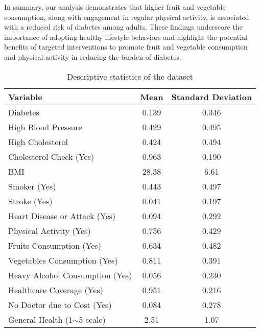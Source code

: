 \documentclass[11pt]{article}
\begin{document}
In summary, our analysis demonstrates that higher fruit and vegetable consumption, along with engagement in regular physical activity, is associated with a reduced risk of diabetes among adults. These findings underscore the importance of adopting healthy lifestyle behaviors and highlight the potential benefits of targeted interventions to promote fruit and vegetable consumption and physical activity in reducing the burden of diabetes.\begin{table}[!htbp]
\centering
\caption{Descriptive statistics of the dataset}
\label{table1}
\begin{tabular}{l c c}
\toprule
\textbf{Variable}                & \textbf{Mean}       & \textbf{Standard Deviation} \\
\midrule
Diabetes                         & 0.139               & 0.346                       \\
High Blood Pressure              & 0.429               & 0.495                       \\
High Cholesterol                 & 0.424               & 0.494                       \\
Cholesterol Check (Yes)          & 0.963               & 0.190                       \\
BMI                              & 28.38               & 6.61                        \\
Smoker (Yes)                     & 0.443               & 0.497                       \\
Stroke (Yes)                     & 0.041               & 0.197                       \\
Heart Disease or Attack (Yes)    & 0.094               & 0.292                       \\
Physical Activity (Yes)          & 0.756               & 0.429                       \\
Fruits Consumption (Yes)         & 0.634               & 0.482                       \\
Vegetables Consumption (Yes)     & 0.811               & 0.391                       \\
Heavy Alcohol Consumption (Yes)  & 0.056               & 0.230                       \\
Healthcare Coverage (Yes)        & 0.951               & 0.216                       \\
No Doctor due to Cost (Yes)      & 0.084               & 0.278                       \\
General Health (1$\sim$5 scale)  & 2.51                & 1.07                        \\

\end{tabular}
\end{table}
\end{document}
